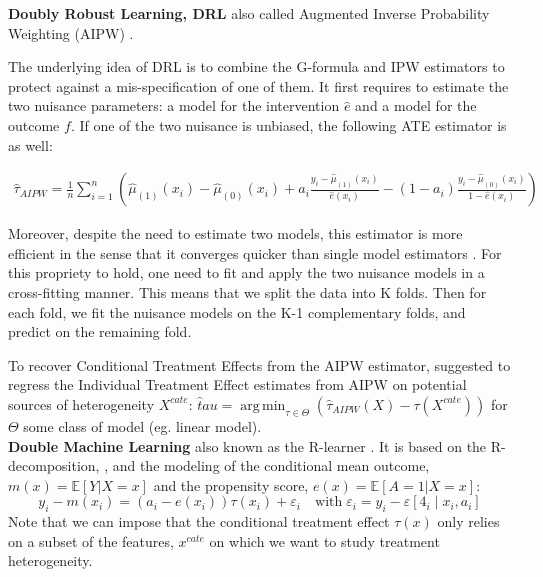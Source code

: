 \documentclass[10pt,letterpaper]{article}
\DeclareMathOperator*{\argmin}{arg\,min}
\begin{document}
\textbf{Doubly Robust Learning, DRL} also called Augmented Inverse
Probability Weighting (AIPW) \cite{robins1994estimation}.

The underlying idea of DRL is to combine the G-formula and IPW estimators to
protect against a mis-specification of one of them. It first requires to
estimate the two nuisance parameters: a model for the intervention $\hat{e}$
and a model for the outcome $f$. If one of the two nuisance is unbiased, the
following ATE estimator is as well:

$$\begin{aligned} \widehat{\tau}_{A I P W}=\frac{1}{n}
    \sum_{i=1}^{n}\left(\hat \mu_{(1)}\left(x_{i}\right)-\hat \mu_{(0)}\left(x_{i}\right)+a_{i}
    \frac{y_{i}-\hat \mu_{(1)}\left(x_{i}\right)}{\hat{e}\left(x_{i}\right)}-\left(1-a_{i}\right)
    \frac{y_{i}-\hat \mu_{(0)}\left(x_{i}\right)}{1-\hat{e}\left(x_{i}\right)}\right)
  \end{aligned}$$

Moreover, despite the need to estimate two models, this estimator is more
efficient in the sense that it converges quicker than single model estimators
\cite{wager2020stats}. For this propriety to hold, one need to fit and apply
the two nuisance models in a cross-fitting manner. This means that we split
the data into K folds. Then for each fold, we fit the nuisance models on the
K-1 complementary folds, and predict on the remaining fold.

To recover Conditional Treatment Effects from the AIPW estimator,
\cite{foster2019orthogonal} suggested to regress the Individual Treatment
Effect estimates from AIPW on potential sources of heterogeneity $X^{cate}$:
$\hat tau = \argmin_{\tau \in \Theta} (\hat \tau_{AIPW}(X) - \tau(X^{cate}))$
for $\Theta$ some class of model (eg. linear model).\\

\textbf{Double Machine Learning} \cite{chernozhukov2018double} also known
as the R-learner \cite{nie2021quasi}. It is based on the R-decomposition,
\cite{robinson1988root}, and the modeling of the conditional mean outcome,
$m(x)=\mathbb E[Y|X=x]$ and the propensity score, $e(x)=\mathbb E[A=1|X=x]$:
\begin{equation}\label{eq:r_decomposition}
  y_{i}-m\left(x_{i}\right)=\left(a_{i}-e\left(x_{i}\right)\right) \tau\left(x_{i}\right)+\varepsilon_{i} \quad \text{with} \; \varepsilon_{i}=y_{i}-\varepsilon\left[4_{i} \mid x_{i}, a_{i}\right]
\end{equation}
Note that we can impose that the conditional treatment effect $\tau(x)$ only
relies on a subset of the features, $x^{cate}$ on which we want to study
treatment heterogeneity.
\end{document}
